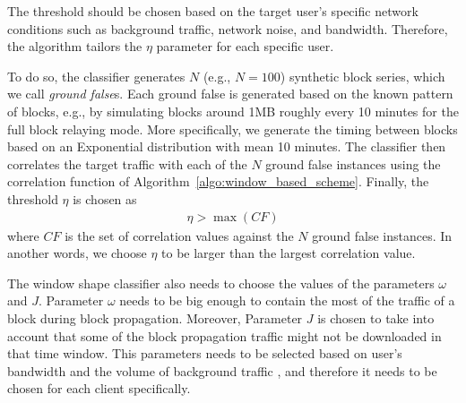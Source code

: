  The threshold should be chosen based on the target user's specific network conditions such as background traffic, network noise, and bandwidth. Therefore, the algorithm tailors the $\eta$ parameter for each specific user. 


To do so, the classifier generates $N$ (e.g., $N=100$) synthetic block series, which we call \emph{ground false}s. 
Each ground false is generated based on the known pattern of \bc blocks, e.g., by simulating blocks around 1MB roughly every 10 minutes for the full block relaying mode. More specifically, we generate the timing between blocks based on an Exponential distribution with mean 10 minutes.
%
The classifier then correlates the target traffic with each of the $N$ ground false instances using the correlation function of Algorithm~\ref{algo:window_based_scheme}. Finally, the threshold $\eta$ is chosen as 
\begin{align}\label{gt_gf}
\eta > \max(CF) 
\end{align}
where $CF$ is the set of correlation values against the $N$ ground false instances. In another words, we choose $\eta$ to be larger than the largest correlation value.

 The window shape classifier also needs to choose the values of the parameters $\omega$ and $J$. Parameter $\omega$ needs to be big enough to contain the most of the traffic of a block during block propagation. Moreover, Parameter $J$ is chosen to take into account that some  of the block propagation traffic might not be downloaded in that time window. This parameters needs to be selected based on user's bandwidth and the volume of background traffic , and therefore it needs to be chosen for each client specifically. 



\iffalse The window size parameter \textbf{\textit{$\omega$}} represents the delay for a client to fully receive a specific block. Therefore, it should be based on two features: propagation delay and download time. The propagation delay is usually smaller than the download time so we ignore it in choosing \textit{$\omega$}. 
We estimate a target client's block downloading time as $\frac{block\ size}{client's\ bandwidth}$.The parameter $J$ represents natural network jitter for the target client. To derive $J$ for each user, we derive the difference of traffic volume in the user's consecutive time windows, excluding the windows that arrive close to the times of blocks (note that we do not know if this is a \bc client or not). In other words, we measure $\Delta V$'s for windows that do not collide with block times.  
 $J$ is the standard deviation of such difference values.\fi

